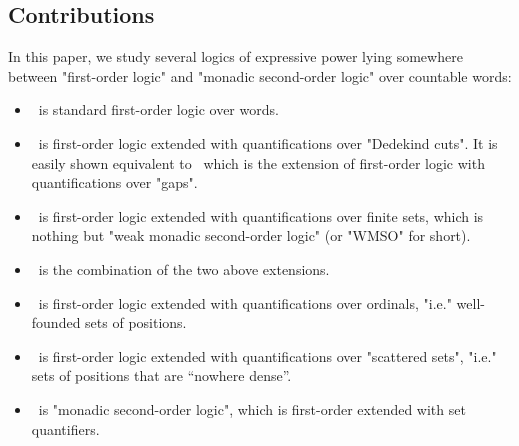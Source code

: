 \subsection{Contributions}

In this paper, we study several logics of expressive power lying somewhere between "first-order logic" and "monadic second-order logic" over countable words:
\begin{itemize}
	\item \fo\ is standard first-order logic over words.
	\item \focut\ is first-order logic extended with quantifications over "Dedekind cuts". It is easily shown equivalent to \fo[gap]\ which is the extension of first-order logic with quantifications over "gaps".
	\item \fofinite\ is first-order logic extended with quantifications over finite sets, which is nothing but "weak monadic second-order logic" (or "WMSO" for short).
	\item \fofinitecut\ is the combination of the two above extensions.
	\item \foordinal\ is first-order logic extended with quantifications over ordinals, "i.e." well-founded sets of positions.
	\item \foscattered\ is first-order logic extended with quantifications over "scattered sets", "i.e." sets of positions that are ``nowhere dense''.
	\item \mso\ is "monadic second-order logic", which is first-order extended with set quantifiers.
\end{itemize}

